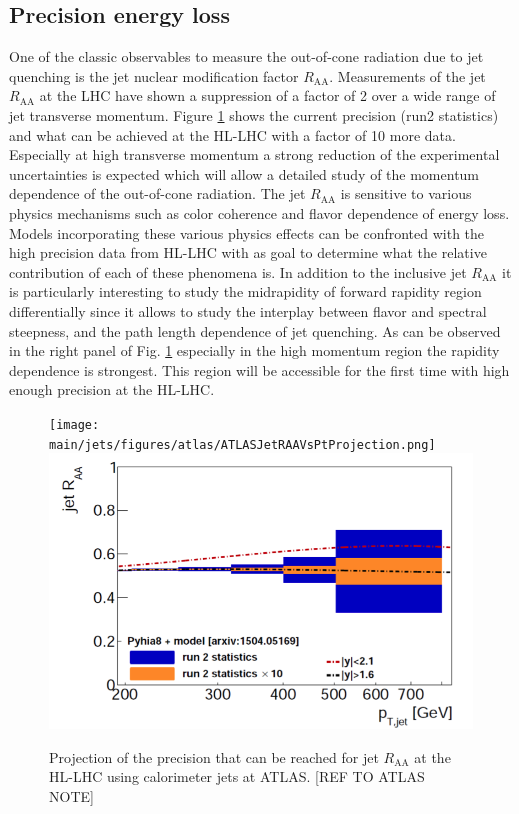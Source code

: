 \subsection{Precision energy loss}
One of the classic observables to measure the out-of-cone radiation due to jet quenching is the jet nuclear modification factor $R_{\mathrm{AA}}$. Measurements of the jet $R_{\mathrm{AA}}$ at the LHC have shown a suppression of a factor of 2 over a wide range of jet transverse momentum. Figure \ref{fig:jetRAA} shows the current precision (run2 statistics) and what can be achieved at the HL-LHC with a factor of 10 more data. Especially at high transverse momentum a strong reduction of the experimental uncertainties is expected which will allow a detailed study of the momentum dependence of the out-of-cone radiation. The jet $R_{\mathrm{AA}}$ is sensitive to various physics mechanisms such as color coherence and flavor dependence of energy loss. Models incorporating these various physics effects can be confronted with the high precision data from HL-LHC with as goal to determine what the relative contribution of each of these phenomena is. In addition to the inclusive jet $R_{\mathrm{AA}}$ it is particularly interesting to study the midrapidity of forward rapidity region differentially since it allows to study the interplay between flavor and spectral steepness, and the path length dependence of jet quenching. As can be observed in the right panel of Fig. \ref{fig:jetRAA} especially in the high momentum region the rapidity dependence is strongest. This region will be accessible for the first time with high enough precision at the HL-LHC.
\begin{figure}[!ht]
\begin{center}
\texttt{[image: \\main/jets/figures/atlas/ATLASJetRAAVsPtProjection.png]}
\includegraphics[width=.45\textwidth]{figures/atlas/ATLASJetRAAVsPtEtaBinsProjection.png}
\caption{Projection of the precision that can be reached for jet $R_{\mathrm{AA}}$ at the HL-LHC using calorimeter jets at ATLAS. [REF TO ATLAS NOTE]}
\label{fig:jetRAA}
\end{center}
\end{figure}


